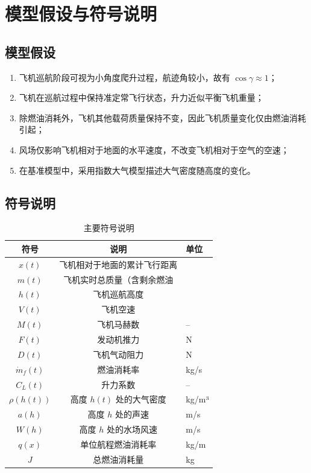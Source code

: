 \documentclass[UTF8]{ctexart}
\begin{document}
\section{模型假设与符号说明}

\subsection{模型假设}
\begin{enumerate}
    \item 飞机巡航阶段可视为小角度爬升过程，航迹角较小，故有 $\cos\gamma\approx 1$；
    \item 飞机在巡航过程中保持准定常飞行状态，升力近似平衡飞机重量；
    \item 除燃油消耗外，飞机其他载荷质量保持不变，因此飞机质量变化仅由燃油消耗引起；
    \item 风场仅影响飞机相对于地面的水平速度，不改变飞机相对于空气的空速；
    \item 在基准模型中，采用指数大气模型描述大气密度随高度的变化。
\end{enumerate}

\subsection{符号说明}
\begin{table}[htbp]
\centering
\caption{主要符号说明}
\label{tab:symbols}
\begin{tabular}{ccl}
\toprule
符号 & 说明 & 单位 \\
\midrule
$x(t)$ & 飞机相对于地面的累计飞行距离& \\
$m(t)$ & 飞机实时总质量（含剩余燃油& \\
$h(t)$ & 飞机巡航高度& \\
$V(t)$ & 飞机空速& \\
$M(t)$  & 飞机马赫数& -- \\
$F(t)$ & 发动机推力 & N \\
$D(t)$  & 飞机气动阻力& N \\
$\dot m_f(t)$  & 燃油消耗率& kg/s \\
$C_L(t)$ & 升力系数& -- \\
$\rho(h(t))$ & 高度 $h(t)$ 处的大气密度& kg/m³ \\
$a(h)$& 高度 $h$ 处的声速& m/s \\
$W(h)$& 高度 $h$ 处的水场风速& m/s \\
$q(x)$ & 单位航程燃油消耗率& kg/m \\
$J$ & 总燃油消耗量& kg \\
\bottomrule
\end{tabular}
\end{table}
\end{document}
